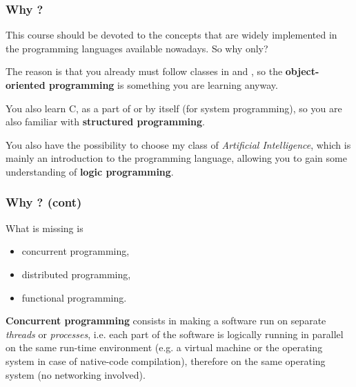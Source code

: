 
%
\begin{frame}
\frametitle{Why \Erlang?}

This course should be devoted to the concepts that are widely
implemented in the programming languages available nowadays. So why
\Erlang only?

\bigskip

The reason is that you already must follow classes in \Java and \cpp,
so the \textbf{object-oriented programming} is something you are
learning anyway.

\bigskip

You also learn C, as a part of \cpp{} or by itself (for system
programming), so you are also familiar with \textbf{structured
  programming}.

\bigskip

You also have the possibility to choose my class of \emph{Artificial
  Intelligence}, which is mainly an introduction to the \Prolog
programming language, allowing you to gain some understanding of
\textbf{logic programming}.

\end{frame}

%
\begin{frame}
\frametitle{Why \Erlang? (cont)}

What is missing is
\begin{itemize}

  \item concurrent programming,

  \item distributed programming,

  \item functional programming.

\end{itemize}
\textbf{Concurrent programming} consists in making a software run on
separate \emph{threads} or \emph{processes}, i.e. each part of the
software is logically running in parallel on the same run-time
environment (e.g.  a virtual machine or the operating system in case
of native-code compilation), therefore on the same operating system
(no networking involved).

\end{frame}

